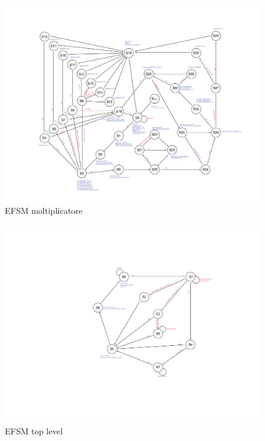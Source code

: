 \documentclass[]{IEEEtran}
\begin{document}
\begin{figure}[bt]
	\centering
	\includegraphics[width=\textwidth]{figures/efsm_mul.png}
	\caption{EFSM moltiplicatore}
	\label{fig:efsmmul}
\end{figure}

\begin{figure}[bt]
	\centering
	\includegraphics[width=\columnwidth]{figures/efsm_tl.png}
	\caption{EFSM top level}
	\label{fig:efsmtl}
\end{figure}
\end{document}
